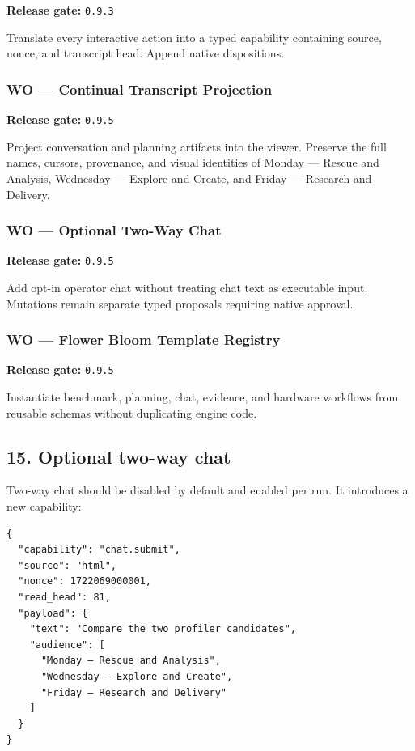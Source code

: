 \textbf{Release gate:} \texttt{0.9.3}

Translate every interactive action into a typed capability containing source,
nonce, and transcript head. Append native dispositions.

\subsubsection{WO --- Continual Transcript Projection}

\textbf{Release gate:} \texttt{0.9.5}

Project conversation and planning artifacts into the viewer. Preserve the full
names, cursors, provenance, and visual identities of Monday --- Rescue and
Analysis, Wednesday --- Explore and Create, and Friday --- Research and Delivery.

\subsubsection{WO --- Optional Two-Way Chat}

\textbf{Release gate:} \texttt{0.9.5}

Add opt-in operator chat without treating chat text as executable input.
Mutations remain separate typed proposals requiring native approval.

\subsubsection{WO --- Flower Bloom Template Registry}

\textbf{Release gate:} \texttt{0.9.5}

Instantiate benchmark, planning, chat, evidence, and hardware workflows from
reusable schemas without duplicating engine code.

\subsection{15. Optional two-way chat}

Two-way chat should be disabled by default and enabled per run. It introduces a
new capability:

\begin{verbatim}
{
  "capability": "chat.submit",
  "source": "html",
  "nonce": 1722069000001,
  "read_head": 81,
  "payload": {
    "text": "Compare the two profiler candidates",
    "audience": [
      "Monday — Rescue and Analysis",
      "Wednesday — Explore and Create",
      "Friday — Research and Delivery"
    ]
  }
}
\end{verbatim}

